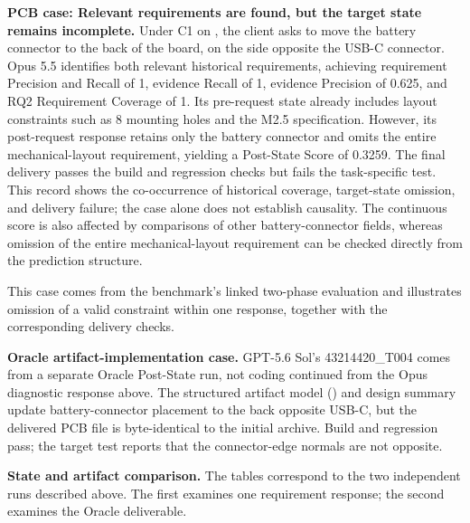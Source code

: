 \documentclass{article} %
\begin{document}
\textbf{PCB case: Relevant requirements are found, but the target state remains incomplete.} Under C1 on , the client asks to move the battery connector to the back of the board, on the side opposite the USB-C connector. Opus 5.5 identifies both relevant historical requirements, achieving requirement Precision and Recall of 1, evidence Recall of 1, evidence Precision of 0.625, and RQ2 Requirement Coverage of 1. Its pre-request state already includes layout constraints such as 8 mounting holes and the M2.5 specification. However, its post-request response retains only the battery connector and omits the entire mechanical-layout requirement, yielding a Post-State Score of 0.3259. The final delivery passes the build and regression checks but fails the task-specific test. This record shows the co-occurrence of historical coverage, target-state omission, and delivery failure; the case alone does not establish causality. The continuous score is also affected by comparisons of other battery-connector fields, whereas omission of the entire mechanical-layout requirement can be checked directly from the prediction structure.

This case comes from the benchmark's linked two-phase evaluation and illustrates omission of a valid constraint within one response, together with the corresponding delivery checks.

\textbf{Oracle artifact-implementation case.} GPT-5.6 Sol's 43214420\_T004 comes from a separate Oracle Post-State run, not coding continued from the Opus diagnostic response above. The structured artifact model () and design summary update battery-connector placement to the back opposite USB-C, but the delivered PCB file is byte-identical to the initial archive. Build and regression pass; the target test reports that the connector-edge normals are not opposite.

\textbf{State and artifact comparison.} The tables correspond to the two independent runs described above. The first examines one requirement response; the second examines the Oracle deliverable.
\end{document}
